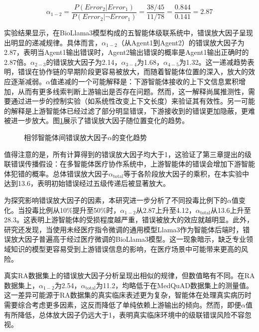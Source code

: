 \begin{equation}
\alpha_{1-2} = \frac{P(Error_2|Error_1)}{P(Error_2|\neg Error_1)} = \frac{38/45}{11/78} = \frac{0.844}{0.141} = 2.87
\end{equation}

实验结果显示，在BioLlama3模型构成的五智能体级联系统中，错误放大因子呈现出明显的递减规律。具体而言，$\alpha_{1-2}$（从Agent1到Agent2）的错误放大因子为2.87，表明当Agent1输出错误时，Agent2输出错误的概率是Agent1输出正确时的2.87倍。$\alpha_{2-3}$的错误放大因子为2.14，$\alpha_{3-4}$为1.68，$\alpha_{4-5}$为1.32。这一递减趋势表明，错误在协作链的早期阶段更容易被放大，而随着智能体位置的深入，放大的效应逐渐减弱。$\alpha$值递减的一个可能解释是：下游智能体接收的上下文信息累积增加，从而有更多线索判断上游输出是否存在问题。然而，这一解释尚属推测性，需要通过进一步的控制实验（如系统性改变上下文长度）来验证其有效性。另一可能的解释是上游智能体已经过滤了部分明显错误，下游接收到的错误更加隐蔽，更难被进一步放大。图\ref{fig:alpha-trend}展示了错误放大因子随位置变化的趋势。


\begin{figure}[htbp]
\centering
{}
\caption{相邻智能体间错误放大因子$\alpha$的变化趋势}
\label{fig:alpha-trend}
\end{figure}

值得注意的是，所有计算得到的错误放大因子均大于1，这验证了第三章提出的级联错误传播假设：在多智能体医疗协作系统中，上游智能体的错误会增加下游智能体犯错的概率。总体错误放大因子$\alpha_{\text{total}}$等于各阶段放大因子的乘积，在本实验中达到13.6，表明初始错误经过五级传递后被显著放大。

为探究影响错误放大因子的因素，本研究进一步分析了不同投毒比例下的$\alpha$值变化。当投毒比例从10\%提升至50\%时，$\alpha_{1-2}$从2.87上升至4.12，$\alpha_{\text{total}}$从13.6上升至28.3。这表明上游智能体的受损程度越严重，错误被放大的效应就越明显。此外，研究还发现，当使用未经医疗指令微调的通用模型Llama3作为智能体后端时，错误放大因子普遍高于经过医疗微调的BioLlama3模型。这一现象暗示，缺乏专业领域知识的模型更容易受到上游错误信息的影响，在医疗场景中可能带来更高的风险。

真实RA数据集上的错误放大因子分析呈现出相似的规律，但数值略有不同。在RA数据集上，$\alpha_{1-2}$为2.54，$\alpha_{\text{total}}$为11.2，均略低于在MedQuAD数据集上的测量值。这一差异可能源于RA数据集的真实临床表述更为复杂，智能体在处理真实病历时需要综合考虑更多因素，这反而降低了单纯依赖上游输出的倾向。然而，即便$\alpha$值有所降低，总体放大因子仍远大于1，表明真实临床环境中的级联错误风险不容忽视。

